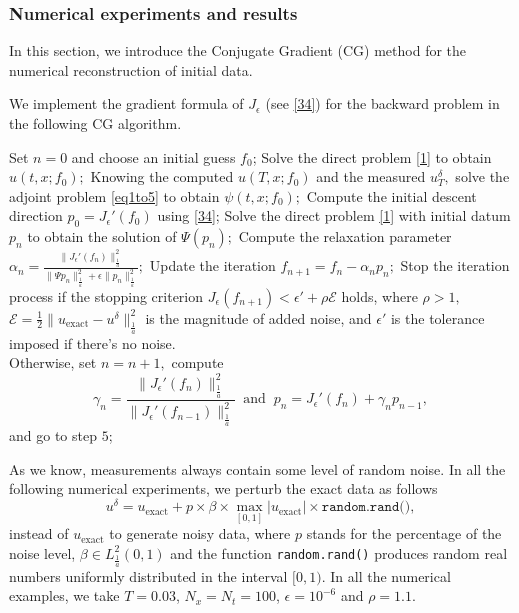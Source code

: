\documentclass[reqno]{amsart}
\theoremstyle{plain}
\theoremstyle{remark}
\numberwithin{equation}{section}
\begin{document}
\subsubsection{\textbf{Numerical experiments and results}}
In this section, we introduce the Conjugate Gradient (CG) method for the numerical reconstruction of initial data.
 
We implement the gradient formula of $J_{\epsilon}$ (see \eqref{34}) for the backward problem in the following CG algorithm.
\smallskip

\begin{algorithm}[H]
        \caption{Conjugate Gradient Algorithm}\label{alg}
        \begin{algorithmic}[1]
            \State Set $n=0$ and choose an initial guess $f_0$;
            \State Solve the direct problem \eqref{1} to obtain $u(t,x;f_0);$
            \State Knowing the computed $ u(T,x;f_0)$ and the measured $u^{\delta}_T,$ solve the adjoint problem  \eqref{eq1to5} to obtain $\psi(t,x;f_0);$
            \State Compute the initial descent direction $p_0=J_{\epsilon}'(f_0)$ using \eqref{34};
            \State Solve the direct problem \eqref{1} with initial datum $p_n$ to obtain the solution of $\Psi(p_n);$
            \State Compute the relaxation parameter $ \alpha_n =\frac{\|J_{\epsilon}'(f_n)\|^2_{\frac{1}{a}}}{\|\Psi p_n\|^2_{\frac{1}{a}}+\epsilon\| p_n\|^2_{\frac{1}{a}}};$
            \State Update the iteration $f_{n+1}=f_n -\alpha_n p_n ;$
            \State Stop the iteration process if the stopping criterion $J_{\epsilon}(f_{n+1})< \epsilon'+\rho \mathcal{E}$ holds,  where $\rho>1,$ $\mathcal{E}=\frac{1}{2} \|u_{\text{exact}}-u^\delta\|_{\frac{1}{a}}^2$ is the magnitude of added noise, and $\epsilon'$ is the tolerance imposed if there's no noise.\\
            Otherwise, set $n=n+1,$ compute
$$ \gamma_n=\frac{\|J_{\epsilon}'(f_n)\|^2_{\frac{1}{a}}}{\|J_{\epsilon}'(f_{n-1})\|^2_{\frac{1}{a}}}\;\; \text{and}\;\; p_n=J_{\epsilon}'(f_n)+\gamma_n p_{n-1},$$
and go to step $5$;
\end{algorithmic}
\end{algorithm}
\smallskip
As we know, measurements always contain some level of random noise. In all the following numerical experiments, we perturb the exact data as follows
\begin{equation}\label{ndata}
    u^{\delta}=u_{\text{exact}}+p\times\beta\times \max_{[0,1]}\vert u_{\text{exact}}\vert \times \texttt{random.rand()},
\end{equation}
instead of $u_{\text{exact}}$ to generate noisy data, where $p$ stands for the percentage of the noise level, $\beta \in L^2_{\frac{1}{a}}(0,1)$ and the function \texttt{random.rand()} produces random real numbers  uniformly distributed in the interval $[0,1)$. In all the numerical examples, we take $T=0.03$, $N_x=N_t=100$, $\epsilon=10^{-6}$ and $\rho=1.1.$
\end{document}

